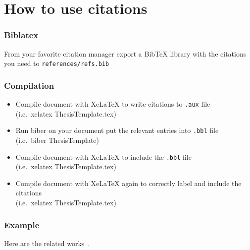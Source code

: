 \chapter{How to use citations} \label{labelIfyouWant}



\subsection{Biblatex}

From your favorite citation manager export a BibTeX library with the citations you need to \texttt{references/refs.bib}



\subsection{Compilation}

\begin{itemize}

   \item Compile document with XeLaTeX to write citations to \texttt{.aux} file\\ (i.e.\ xelatex ThesisTemplate.tex)

   \item Run biber on your document put the relevant entries into \texttt{.bbl} file\\ (i.e.\ biber ThesisTemplate)

   \item Compile document with XeLaTeX to include the \texttt{.bbl} file\\ (i.e.\ xelatex ThesisTemplate.tex)

   \item Compile document with XeLaTeX again to correctly label and include the citations\\ (i.e.\ xelatex ThesisTemplate.tex)

\end{itemize}



\subsection{Example}

Here are the related works~\cite{Chu2019}.

